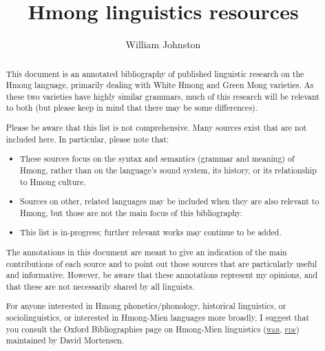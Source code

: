 \documentclass[11pt]{scrartcl}
\title{Hmong linguistics resources}
\author{William Johnston}
\date{} %
\begin{document}
\maketitle
\raggedbottom

\renewcommand{\abstractname}{}
\begin{abstract}
\noindent
This document is an annotated bibliography of published linguistic research on the Hmong language, primarily dealing with White Hmong and Green Mong varieties. As these two varieties have highly similar grammars, much of this research will be relevant to both (but please keep in mind that there may be some differences).

Please be aware that this list is not comprehensive. Many sources exist that are not included here. In particular, please note that: 

\begin{itemize}
\item These sources focus on the syntax and semantics (grammar and meaning) of Hmong, rather than on the language's sound system, its history, or its relationship to Hmong culture. 
\item Sources on other, related languages may be included when they are also relevant to Hmong, but those are not the main focus of this bibliography. 
\item This list is in-progress; further relevant works may continue to be added. 
\end{itemize}

The annotations in this document are meant to give an indication of the main contributions of each source and to point out those sources that are particularly useful and informative. However, be aware that these annotations represent my opinions, and that these are not necessarily shared by all linguists. 

For anyone interested in Hmong phonetics/phonology, historical linguistics, or sociolinguistics, or interested in Hmong-Mien languages more broadly, I suggest that you consult the Oxford Bibliographies page on Hmong-Mien linguistics 
(\href{https://www.oxfordbibliographies.com/view/document/obo-9780199772810/obo-9780199772810-0173.xml}{\textsc{web}}, 
\href{https://williamjohnston.github.io/files/Mortensen-2014.pdf}{\textsc{pdf}}) maintained by David Mortensen.
\end{abstract}

\newpage
\tableofcontents

\newpage
\end{document}
